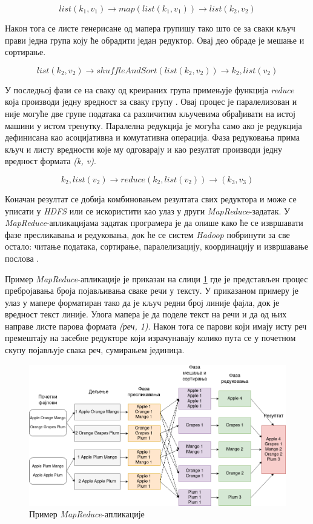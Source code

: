 \documentclass[12pt,oneside]{memoir}
\begin{document}
$$ list(k_1, v_1) \rightarrow map(list(k_1, v_1)) \rightarrow list(k_2, v_2) $$

Након тога се листе генерисане од мапера групишу тако што се за сваки кључ прави једна група коју ће обрадити један редуктор. Овај део обраде је мешање и сортирање. 

$$ list(k_2, v_2) \rightarrow shuffleAndSort(list(k_2, v_2)) \rightarrow k_2, list(v_2) $$

У последњој фази се на сваку од креираних група примењује функција \textit{reduce} која производи једну вредност за сваку групу \cite{hadoop_learning}. Овај процес је паралелизован и није могуће две групе података са различитим кључевима обрађивати на истој машини у истом тренутку. Паралелна редукција је могућа само ако је редукција дефинисана као асоцијативна и комутативна операција. Фаза редуковања прима кључ и листу вредности које му одговарају и као резултат производи једну вредност формата \textit{(k, v)}.

$$ k_2, list(v_2) \rightarrow reduce(k_2, list(v_2)) \rightarrow (k_3, v_3) $$

Коначан резултат се добија комбиновањем резултата свих редуктора и може се уписати у \textit{HDFS} или се искористити као улаз у други \textit{MapReduce}-задатак. У \textit{MapReduce}-апликацијама задатак програмера је да опише како ће се извршавати фазе пресликавања и редуковања, док ће се систем \textit{Hadoop} побринути за све остало: читање података, сортирање, паралелизацију, координацију и извршавање послова \cite{hadoop_beginner}.

Пример \textit{MapReduce}-апликације је приказан на слици \ref{fig:map_reduce} где је представљен процес пребројавања броја појављивања сваке речи у тексту. У приказаном примеру је улаз у мапере форматиран тако да је кључ редни број линије фајла, док је вредност текст линије. Улога мапера је да поделе текст на речи и да од њих направе листе парова формата \textit{(реч, 1)}. Након тога се парови који имају исту реч премештају на засебне редукторе који израчунавају колико пута се у почетном скупу појављује свака реч, сумирањем јединица.

\begin{figure}[!ht]
  \centering
  \includegraphics[width=1\textwidth]{pictures/mr_example_wordcount.png}
  \caption{Пример \textit{MapReduce}-апликације}
  \label{fig:map_reduce}
\end{figure}
\end{document}
